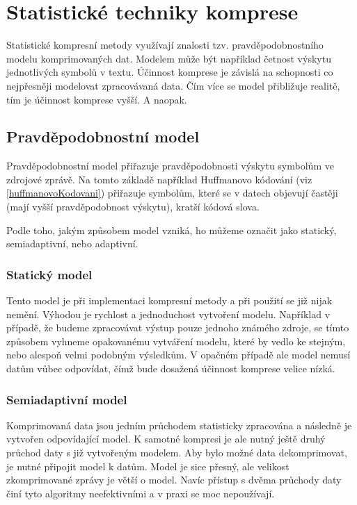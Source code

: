 \chapter{Statistické techniky komprese}
Statistické kompresní metody využívají znalosti tzv. pravděpodobnostního modelu komprimovaných dat. Modelem může být například četnost výskytu jednotlivých symbolů v textu. Účinnost komprese je závislá na schopnosti co nejpřesněji modelovat zpracovávaná data. Čím více se model přibližuje realitě, tím je účinnost komprese vyšší. A naopak.

\section{Pravděpodobnostní model}
\label{pravdepodobnostniModel}
Pravděpodobnostní model přiřazuje pravděpodobnosti výskytu symbolům ve zdrojové zprávě. Na tomto základě například Huffmanovo kódování (viz \ref{huffmanovoKodovani}) přiřazuje symbolům, které se v datech objevují častěji (mají vyšší pravděpodobnost výskytu), kratší kódová slova.

Podle toho, jakým způsobem model vzniká, ho můžeme označit jako statický, semiadaptivní, nebo adaptivní.

\subsection{Statický model}
Tento model je při implementaci kompresní metody a při použití se již nijak nemění. Výhodou je rychlost a jednoduchost vytvoření modelu. Například v případě, že budeme zpracovávat výstup pouze jednoho známého zdroje, se tímto způsobem vyhneme opakovanému vytváření modelu, které by vedlo ke stejným, nebo alespoň velmi podobným výsledkům. V opačném případě ale model nemusí datům vůbec odpovídat, čímž bude dosažená účinnost komprese velice nízká.

\subsection{Semiadaptivní model}
Komprimovaná data jsou jedním průchodem statisticky zpracována a následně je vytvořen odpovídající model. K samotné kompresi je ale nutný ještě druhý průchod daty s již vytvořeným modelem. Aby bylo možné data dekomprimovat, je nutné připojit model k datům. Model je sice přesný, ale velikost zkomprimované zprávy je větší o model. Navíc přístup s dvěma průchody daty činí tyto algoritmy neefektivními a v praxi se moc nepoužívají.

